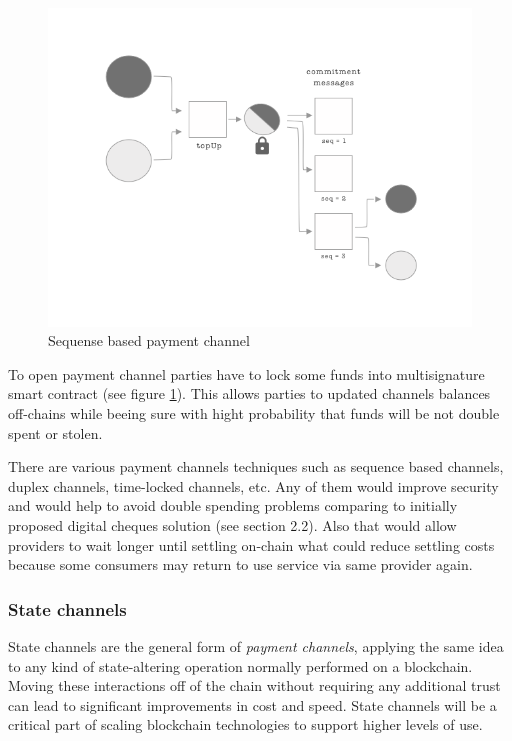 \documentclass[a4paper,12pt]{article}
\begin{document}
\begin{figure}[H]
    \centering
    \includegraphics[scale=0.5]{img/payment-channel}
    \caption{Sequense based payment channel}
    \label{img:payment-channel}
\end{figure}

To open payment channel parties have to lock some funds into multisignature 
smart contract (see figure \ref{img:payment-channel}). This allows parties to
updated channels balances off-chains while beeing sure with hight probability 
that funds will be not double spent or stolen.

There are various payment channels techniques such as sequence based channels, 
duplex channels, time-locked channels, etc. Any of them would improve security 
and would help to avoid double spending problems comparing to initially proposed
digital cheques solution (see section 2.2). Also that would allow providers to
wait longer until settling on-chain what could reduce settling costs because 
some consumers may return to use service via same provider again. \\

\subsubsection{State channels}

State channels are the general form of \textit{payment channels}, applying the
same idea to any kind of state-altering operation normally performed on a 
blockchain. Moving these interactions off of the chain without requiring any 
additional trust can lead to significant improvements in cost and speed. State 
channels will be a critical part of scaling blockchain technologies to support 
higher levels of use.
\end{document}
